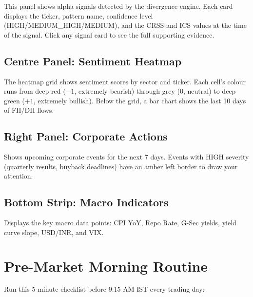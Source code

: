 \documentclass[12pt, a4paper]{report}
\begin{document}
This panel shows alpha signals detected by the divergence engine. Each card displays the ticker, pattern name, confidence level (HIGH/MEDIUM\_HIGH/MEDIUM), and the CRSS and ICS values at the time of the signal. Click any signal card to see the full supporting evidence.

\section{Centre Panel: Sentiment Heatmap}

The heatmap grid shows sentiment scores by sector and ticker. Each cell's colour runs from deep red ($-1$, extremely bearish) through grey (0, neutral) to deep green ($+1$, extremely bullish). Below the grid, a bar chart shows the last 10 days of FII/DII flows.

\section{Right Panel: Corporate Actions}

Shows upcoming corporate events for the next 7 days. Events with HIGH severity (quarterly results, buyback deadlines) have an amber left border to draw your attention.

\section{Bottom Strip: Macro Indicators}

Displays the key macro data points: CPI YoY, Repo Rate, G-Sec yields, yield curve slope, USD/INR, and VIX.

\chapter{Pre-Market Morning Routine}

Run this 5-minute checklist before 9:15 AM IST every trading day:
\end{document}
